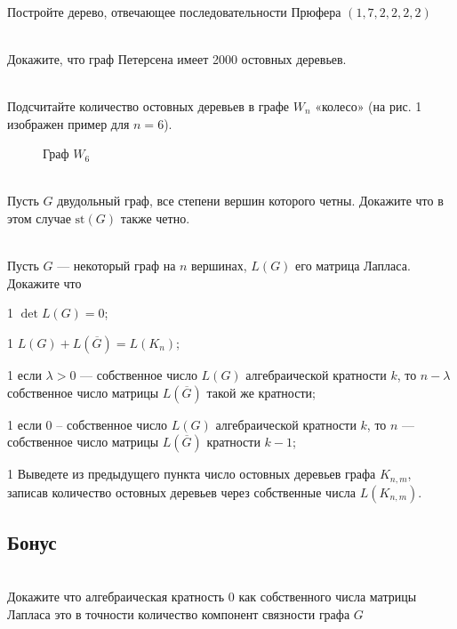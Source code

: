 \documentclass[a4paper,12pt,twoside]{article}
\begin{document}
\begin{?}\ \\
     Постройте дерево, отвечающее последовательности Прюфера $(1, 7, 2, 2, 2, 2)$
\end{?}
\begin{?}\ \\
     Докажите, что граф Петерсена имеет 2000 остовных деревьев.
\end{?} 
\begin{?}\ \\
      Подсчитайте количество остовных деревьев в графе $W_n$ «колесо» (на рис. 1 изображен пример для  $n = 6$).
    \begin{figure}[H]
        \centering
        \caption{Граф $W_6$}
    \end{figure}
\end{?}
\begin{?}\ \\
     Пусть $G$ двудольный граф, все степени вершин которого четны. Докажите что в этом случае $\mathrm{st}(G)$ также четно.
\end{?}
\begin{?}\ \\
     Пусть $G$ --- некоторый граф на $n$ вершинах, $L(G)$ его матрица Лапласа. Докажите что
    \begin{tasklist}
        \item[1] $\det L(G) = 0$;
        \item[1] $L(G) + L(\overline{G}) = L(K_n)$;
        \item[1] если $\lambda > 0$ --- собственное число $L(G)$ алгебраической кратности $k$, то $n - \lambda$ собственное число матрицы $L(\overline{G})$ такой же кратности;
        \item[1] если $0$ -- собственное число $L(G)$ алгебраической кратности $k$, то $n$ --- собственное число матрицы $L(\overline{G})$ кратности $k-1$;
        \item[1] Выведете из предыдущего пункта число остовных деревьев графа $K_{n, m}$, записав количество остовных деревьев через собственные числа $L(K_{n, m})$.
    \end{tasklist}
\end{?}

\subsection*{Бонус}
\begin{?}\ \\
     Докажите что алгебраическая кратность 0 как собственного числа матрицы Лапласа это в точности количество компонент связности графа $G$
\end{?}
\end{document}
